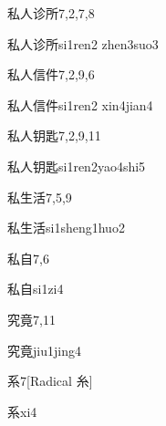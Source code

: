 \begin{entry}{私人诊所}{7,2,7,8}
  \begin{phonetics}{私人诊所}{si1ren2 zhen3suo3}
  \end{phonetics}
\end{entry}

\begin{entry}{私人信件}{7,2,9,6}
  \begin{phonetics}{私人信件}{si1ren2 xin4jian4}
  \end{phonetics}
\end{entry}

\begin{entry}{私人钥匙}{7,2,9,11}
  \begin{phonetics}{私人钥匙}{si1ren2yao4shi5}
  \end{phonetics}
\end{entry}

\begin{entry}{私生活}{7,5,9}
  \begin{phonetics}{私生活}{si1sheng1huo2}
  \end{phonetics}
\end{entry}

\begin{entry}{私自}{7,6}
  \begin{phonetics}{私自}{si1zi4}
  \end{phonetics}
\end{entry}

\begin{entry}{究竟}{7,11}
  \begin{phonetics}{究竟}{jiu1jing4}
  \end{phonetics}
\end{entry}

\begin{entry}{系}{7}[Radical 糸]
  \begin{phonetics}{系}{xi4}
  \end{phonetics}
\end{entry}

